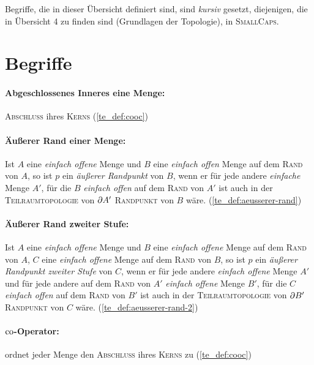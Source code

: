 

\newcommand{\overviewnumber}{5}
\newcommand{\overviewname}{Weitere topologische Begriffe}



\noindent
Begriffe, die in dieser Übersicht definiert sind, sind \textit{kursiv} gesetzt, diejenigen, die in Übersicht 4 zu finden sind (Grundlagen der Topologie), in \textsc{SmallCaps}.

\section*{Begriffe}

    \paragraph{Abgeschlossenes Inneres eine Menge:} \textsc{Abschluss} ihres \textsc{Kerns} (\ref{te_def:cooc})
    
    \paragraph{Äußerer Rand einer Menge:} Ist $A$ eine \textit{einfach offene} Menge und $B$ eine \textit{einfach offen} Menge auf dem \textsc{Rand} von $A$, so ist $p$ ein \textit{äußerer Randpunkt} von $B$, wenn er für jede andere \textit{einfache} Menge $A'$, für die $B$ \textit{einfach offen} auf dem \textsc{Rand} von $A'$ ist auch in der \textsc{Teilraumtopologie} von $\partial A'$ \textsc{Randpunkt} von $B$ wäre. (\ref{te_def:aeusserer-rand})
    
    \paragraph{Äußerer Rand zweiter Stufe:} Ist $A$ eine \textit{einfach offene} Menge und $B$ eine \textit{einfach offene} Menge auf dem \textsc{Rand} von $A$, $C$ eine \textit{einfach offene} Menge auf dem \textsc{Rand} von $B$, so ist $p$ ein \textit{äußerer Randpunkt zweiter Stufe} von $C$, wenn er für jede andere \textit{einfach offene} Menge $A'$ und für jede andere auf dem \textsc{Rand} von $A'$ \textit{einfach offene} Menge $B'$, für die $C$ \textit{einfach offen} auf dem \textsc{Rand} von $B'$ ist auch in der \textsc{Teilraumtopologie} von $\partial B'$ \textsc{Randpunkt} von $C$ wäre.  (\ref{te_def:aeusserer-rand-2})

    \paragraph{$\text{co}$-Operator:} ordnet jeder Menge den \textsc{Abschluss} ihres \textsc{Kerns} zu (\ref{te_def:cooc})
    
